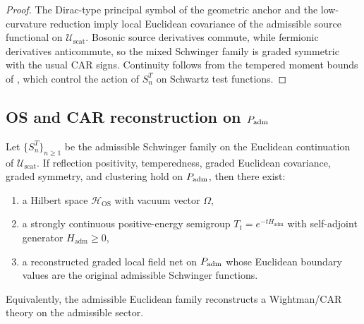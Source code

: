 \begin{proof}
The Dirac-type principal symbol of the geometric anchor and the low-curvature reduction imply local
Euclidean covariance of the admissible source functional on $\mathcal U_{\mathrm{scat}}$. Bosonic
source derivatives commute, while fermionic derivatives anticommute, so the mixed Schwinger family
is graded symmetric with the usual CAR signs. Continuity follows from the tempered moment bounds of
, which control the action of $S_n^T$ on Schwartz test
functions.
\end{proof}

\subsection{OS and CAR reconstruction on \texorpdfstring{$P_{\mathrm{adm}}$}{Padm}}

\begin{theorem}
\label{thm:tailored-os-car-reconstruction}
Let $\{S_n^T\}_{n\ge 1}$ be the admissible Schwinger family on the Euclidean continuation of
$\mathcal U_{\mathrm{scat}}$. If reflection positivity, temperedness, graded Euclidean covariance,
graded symmetry, and clustering hold on $P_{\mathrm{adm}}$, then there exist:
\begin{enumerate}[label=(\roman*), leftmargin=1.8em, topsep=3pt, itemsep=2pt]
    \item a Hilbert space $\mathcal H_{\mathrm{OS}}$ with vacuum vector $\Omega$,
    \item a strongly continuous positive-energy semigroup $T_t=e^{-tH_{\mathrm{adm}}}$ with
    self-adjoint generator $H_{\mathrm{adm}}\ge 0$,
    \item a reconstructed graded local field net on $P_{\mathrm{adm}}$ whose Euclidean boundary values are the
    original admissible Schwinger functions.
\end{enumerate}
Equivalently, the admissible Euclidean family reconstructs a Wightman/CAR theory on the admissible
sector.
\end{theorem}

